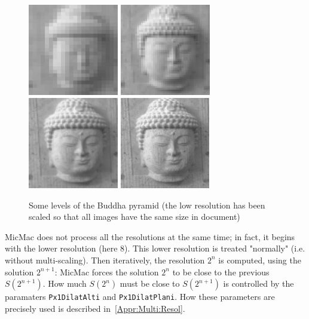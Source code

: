 \begin{figure}
\includegraphics[height=40mm]{FIGS/Boudhas/Pyr32.jpg}
\includegraphics[height=40mm]{FIGS/Boudhas/Pyr16.jpg}
\includegraphics[height=40mm]{FIGS/Boudhas/Pyr8.jpg}
\includegraphics[height=40mm]{FIGS/Boudhas/Pyr4.jpg}
\caption{Some levels of the Buddha pyramid (the low resolution has been scaled so
     that all images have the same size in document)}
\label{FIG:IM:MULRES}
\end{figure}

MicMac does not process all the resolutions at the same time; in fact, it begins
with the lower resolution (here $8$). This lower resolution is treated "normally"
(i.e. without multi-scaling). Then iteratively, the resolution $2^n$ is computed,
using the solution $2^{n+1}$: MicMac forces the solution $2^n$ to be close
to the previous $S(2^{n+1})$. How much $S(2^n)$ must be close to  $S(2^{n+1})$ is
controlled by the paramaters {\tt Px1DilatAlti} and {\tt Px1DilatPlani}.
How these parameters are precisely used is described in~\ref{Appr:Multi:Resol}.

